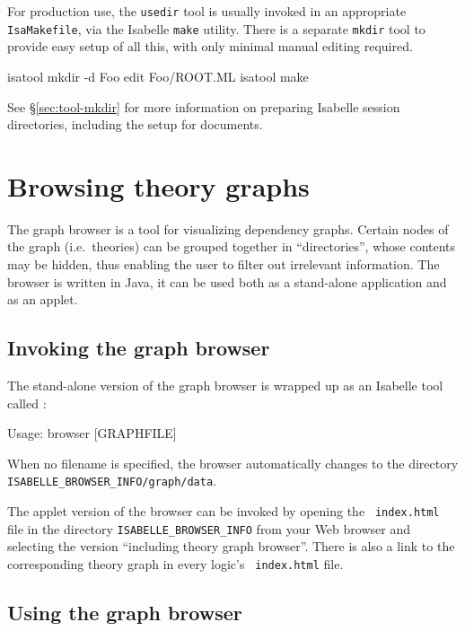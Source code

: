\medskip For production use, the \texttt{usedir} tool is usually invoked in an
appropriate \texttt{IsaMakefile}, via the Isabelle \texttt{make} utility.
There is a separate \texttt{mkdir} tool to provide easy setup of all this,
with only minimal manual editing required.
\begin{ttbox}
isatool mkdir -d Foo
edit Foo/ROOT.ML
isatool make
\end{ttbox}
See \S\ref{sec:tool-mkdir} for more information on preparing Isabelle session
directories, including the setup for documents.


\section{Browsing theory graphs} \label{sec:browse}

The graph browser is a tool for visualizing dependency graphs. Certain nodes
of the graph (i.e.~theories) can be grouped together in ``directories'', whose
contents may be hidden, thus enabling the user to filter out irrelevant
information.  The browser is written in Java, it can be used both as a
stand-alone application and as an applet.


\subsection{Invoking the graph browser}

The stand-alone version of the graph browser is wrapped up as an
Isabelle tool called :
\begin{ttbox}
Usage: browser [GRAPHFILE]
\end{ttbox}
When no filename is specified, the browser automatically changes to
the directory \texttt{ISABELLE_BROWSER_INFO/graph/data}.

\medskip The applet version of the browser can be invoked by opening the {\tt
  index.html} file in the directory \texttt{ISABELLE_BROWSER_INFO} from your
Web browser and selecting the version ``including theory graph browser''.
There is also a link to the corresponding theory graph in every logic's {\tt
  index.html} file.


\subsection{Using the graph browser}

